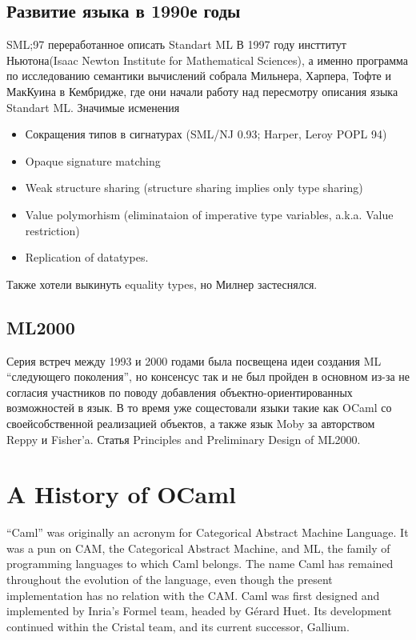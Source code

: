 \documentclass[14pt]{matmex-diploma-custom}
\begin{document}
\subsection{Развитие языка в 1990е годы}
SML;97 переработанное описать Standart ML
В 1997 году инсттитут Ньютона(Isaac Newton Institute for Mathematical Sciences), а именно программа по исследованию семантики вычислений собрала Мильнера, Харпера, Тофте и МакКуина в Кембридже, где они начали работу над пересмотру описания языка Standart ML. Значимые исменения 

\begin{itemize}
 \item Сокращения типов в сигнатурах (SML/NJ 0.93; Harper, Leroy POPL 94)
\item Opaque signature matching
\item Weak structure sharing (structure sharing implies only type sharing) 
\item Value polymorhism (eliminataion of imperative type variables, a.k.a. Value restriction)
\item Replication of datatypes.
\end{itemize}
Также хотели выкинуть equality types, но Милнер застеснялся.

\subsection{ML2000}
Серия встреч между 1993 и 2000 годами была посвещена идеи создания ML “следующего поколения”,  но консенсус так и не был пройден в основном из-за не согласия участников по поводу добавления объектно-ориентированных возможностей в язык.
В то время уже сощестовали языки такие как OCaml со своейсобственной реализацией объектов, а также язык Moby за авторством Reppy и Fisher’a. 
Статья Principles and Preliminary Design of ML2000. 


\section{A History of OCaml}
“Caml” was originally an acronym for Categorical Abstract Machine Language. It was a pun on CAM, the Categorical Abstract Machine, and ML, the family of programming languages to which Caml belongs. The name Caml has remained throughout the evolution of the language, even though the present implementation has no relation with the CAM.
Caml was first designed and implemented by Inria's Formel team, headed by Gérard Huet. Its development continued within the Cristal team, and its current successor, Gallium.
\end{document}
